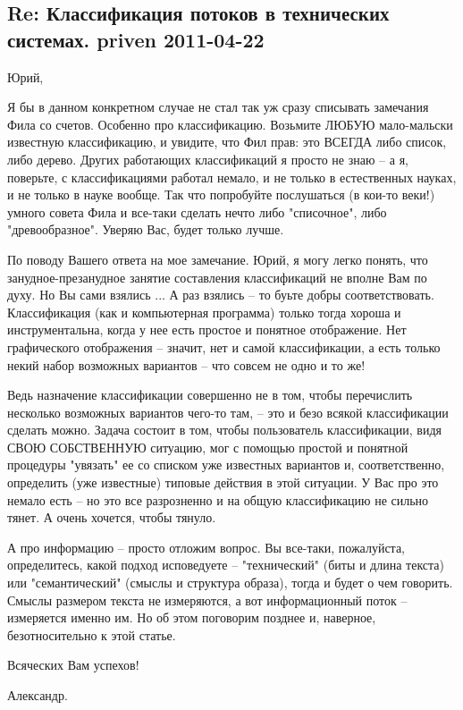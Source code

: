 \documentclass[a4paper,11pt]{article}
\begin{document}
\subsection*{Re: Классификация потоков в технических системах. priven
  2011-04-22} 

Юрий,

Я бы в данном конкретном случае не стал так уж сразу списывать замечания Фила
со счетов. Особенно про классификацию. Возьмите ЛЮБУЮ мало-мальски известную
классификацию, и увидите, что Фил прав: это ВСЕГДА либо список, либо дерево.
Других работающих классификаций я просто не знаю -- а я, поверьте, с
классификациями работал немало, и не только в естественных науках, и не только
в науке вообще. Так что попробуйте послушаться (в кои-то веки!) умного совета
Фила и все-таки сделать нечто либо "списочное", либо "древообразное". Уверяю
Вас, будет только лучше.

По поводу Вашего ответа на мое замечание. Юрий, я могу легко понять, что
занудное-презанудное занятие составления классификаций не вполне Вам по духу.
Но Вы сами взялись ... А раз взялись -- то буьте добры соответствовать.
Классификация (как и компьютерная программа) только тогда хороша и
инструментальна, когда у нее есть простое и понятное отображение. Нет
графического отображения -- значит, нет и самой классификации, а есть только
некий набор возможных вариантов -- что совсем не одно и то же!

Ведь назначение классификации совершенно не в том, чтобы перечислить несколько
возможных вариантов чего-то там, -- это и безо всякой классификации сделать
можно.  Задача состоит в том, чтобы пользователь классификации, видя СВОЮ
СОБСТВЕННУЮ ситуацию, мог с помощью простой и понятной процедуры "увязать" ее
со списком уже известных вариантов и, соответственно, определить (уже
известные) типовые действия в этой ситуации. У Вас про это немало есть -- но
это все разрозненно и на общую классификацию не сильно тянет. А очень хочется,
чтобы тянуло.

А про информацию -- просто отложим вопрос. Вы все-таки, пожалуйста,
определитесь, какой подход исповедуете -- "технический" (биты и длина текста)
или "семантический" (смыслы и структура образа), тогда и будет о чем говорить.
Смыслы размером текста не измеряются, а вот информационный поток -- измеряется
именно им. Но об этом поговорим позднее и, наверное, безотносительно к этой
статье.

Всяческих Вам успехов!

Александр.
\end{document}
